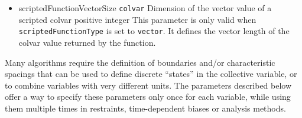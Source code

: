{\begin{itemize}
 \item %
  \key
    {scriptedFunctionVectorSize}{%
    \texttt{colvar}}{%
    Dimension of the vector value of a scripted colvar}{%
    positive integer}{%
    This parameter is only valid when \texttt{scriptedFunctionType} is
    set to \texttt{vector}. It defines the vector length of the colvar value
    returned by the function.}
\end{itemize}
} %




Many algorithms require the definition of boundaries and/or characteristic spacings that can be used to define discrete ``states'' in the collective variable, or to combine variables with very different units.
The parameters described below offer a way to specify these parameters only once for each variable, while using them multiple times in restraints, time-dependent biases or analysis methods.


